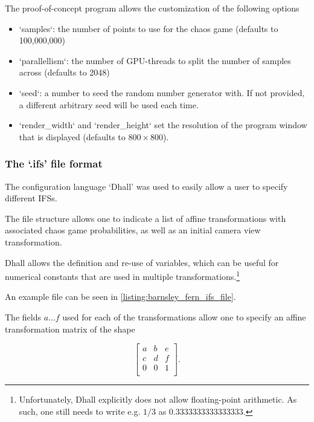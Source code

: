 \documentclass[11pt]{article}
\begin{document}
The proof-of-concept program allows the customization of the following options

\begin{itemize}
\item `samples`: the number of points to use for the chaos game (defaults to 100,000,000)
\item `parallellism`: the number of GPU-threads to split the number of samples across (defaults to 2048)
\item `seed`: a number to seed the random number generator with. If not provided, a different arbitrary seed will be used each time.
\item `render\_width` and `render\_height` set the resolution of the program window that is displayed (defaults to \(800 \times 800\)).
\end{itemize}

\subsubsection{The `.ifs' file format}
\label{sec:org47aa908}

The configuration language `Dhall' \cite{gonzalez2019} was used to 
easily allow a user to specify different IFSs.

The file structure allows one to indicate a list of affine transformations with associated chaos game probabilities,
as well as an initial camera view transformation.

Dhall allows the definition and re-use of variables, which can be useful
for numerical constants that are used in multiple transformations.\footnote{Unfortunately, Dhall explicitly does not allow floating-point arithmetic.
As such, one still needs to write e.g. \(1/3\) as \(0.3333333333333333\).}

An example file can be seen in \autoref{listing:barnsley_fern_ifs_file}.

The fields \(a \ldots f\) used for each of the transformations allow one to specify an affine transformation matrix of the shape

$$\begin{bmatrix} a & b & e \\ c & d & f \\ 0 & 0 & 1 \\ \end{bmatrix}.$$
\end{document}

